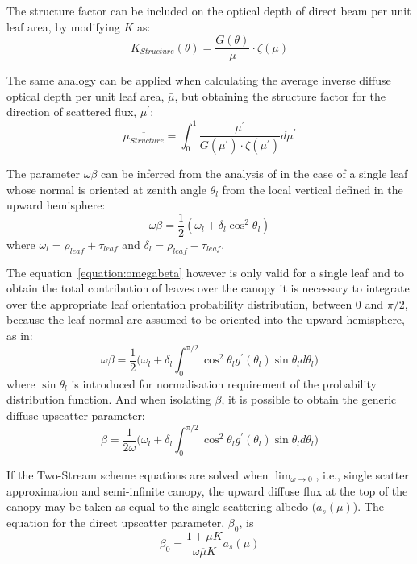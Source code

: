 \documentclass[a4paper,11pt]{report}
\begin{document}
The structure factor can be included on the optical depth of direct beam per unit leaf area, by modifying $K$ as:
\begin{equation}
K_{Structure}(\theta) = \frac{G(\theta)}{\mu} \cdot  \zeta(\mu)
\label{equation:opticaldepthstruct}
\end{equation}

The same analogy can be applied when calculating the average inverse diffuse optical depth per unit leaf area, $\bar{\mu}$, but obtaining the structure factor for the direction of scattered flux, $\mu^\prime$:
\begin{equation}
\overline{\mu_{Structure}} = \int_{0}^{1} \frac{\mu^\prime}{G(\mu^\prime) \cdot \zeta(\mu^\prime)} d\mu^\prime
\label{equation:muprimestruct}
\end{equation}

The parameter $\omega\beta$ can be inferred from the analysis of \citet{Norman1975} in the case of a single leaf whose normal is oriented at zenith angle $\theta_l$ from the local vertical defined in the upward hemisphere:
\begin{equation}
\omega\beta = \frac{1}{2}(\omega_l + \delta_l \cos^2 \theta_l)
\label{equation:omegabeta}
\end{equation}
\noindent where $\omega_l = \rho_{leaf} + \tau_{leaf}$ and $\delta_l = \rho_{leaf} - \tau_{leaf}$. 

The equation~\ref{equation:omegabeta} however is only valid for a single leaf and to obtain the total contribution of leaves over the canopy it is necessary to integrate over the appropriate leaf orientation probability distribution, between 0 and $\pi/2$, because the leaf normal are assumed to be oriented into the upward hemisphere, as in:
\begin{equation}
\omega\beta = \frac{1}{2}\Big(\omega_l + \delta_l \int_{0}^{\pi/2} \cos^2 \theta_l g^\prime(\theta_l) \sin \theta_l d\theta_l\Big)
\label{equation:omegabeta2}
\end{equation}
\noindent where $\sin\theta_l$ is introduced for normalisation requirement of the probability distribution function. And when isolating $\beta$, it is possible to obtain the generic diffuse upscatter parameter:
\begin{equation}
\beta = \frac{1}{2\omega}\Big(\omega_l + \delta_l \int_{0}^{\pi/2} \cos^2 \theta_l g^\prime(\theta_l) \sin \theta_l d\theta_l\Big)
\label{equation:beta}
\end{equation}

If the Two-Stream scheme equations are solved when $\lim_{\omega \to 0}$, i.e., single scatter approximation and semi-infinite canopy, the upward diffuse flux at the top of the canopy may be taken as equal to the single scattering albedo ($a_s(\mu)$). The equation for the direct upscatter parameter, $\beta_0$, is
\begin{equation}
\beta_0 = \frac{1 + \overline{\mu}K}{\omega\overline{\mu}K}a_s(\mu)
\label{equation:betazero}
\end{equation}
\end{document}
